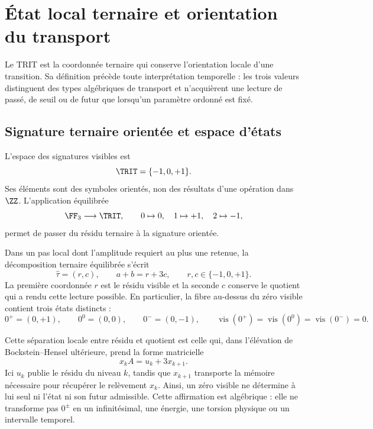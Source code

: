\ifdefined\HMTTRITFormal
\chapter{État local ternaire et orientation du transport}
\label{chap:trit}

Le TRIT est la coordonnée ternaire qui conserve l'orientation locale d'une
transition. Sa définition précède toute interprétation temporelle : les
trois valeurs distinguent des types algébriques de transport et n'acquièrent une
lecture de passé, de seuil ou de futur que lorsqu'un paramètre ordonné est fixé.

\section{Signature ternaire orientée et espace d'états}

L'espace des signatures visibles est
\[
\TRIT=\{-1,0,+1\}.
\]
Ses éléments sont des symboles orientés, non des résultats d'une opération dans
\(\ZZ\). L'application équilibrée
\[
\FF_3\longrightarrow\TRIT,
\qquad0\mapsto0,\quad1\mapsto+1,\quad2\mapsto-1,
\]
permet de passer du résidu ternaire à la signature orientée.

\begin{definition}
\label{def:trit-levantado-carry-rev8}
Dans un pas local dont l'amplitude requiert au plus une retenue, la
décomposition ternaire équilibrée s'écrit
\[
 \widehat\tau=(r,c),\qquad
 a+b=r+3c,
 \qquad r,c\in\{-1,0,+1\}.
\]
La première coordonnée \(r\) est le résidu visible et la seconde \(c\) conserve
le quotient qui a rendu cette lecture possible.  En particulier, la fibre au-dessus du
zéro visible contient trois états distincts :
\[
 0^+=(0,+1),\qquad 0^0=(0,0),\qquad 0^-=(0,-1),
 \qquad
 \operatorname{vis}(0^+)=\operatorname{vis}(0^0)
 =\operatorname{vis}(0^-)=0.
\]
\end{definition}

Cette séparation locale entre résidu et quotient est celle qui, dans l'élévation
de Bockstein--Hensel ultérieure, prend la forme matricielle
\[
 x_k A=u_k+3x_{k+1}.
\]
Ici \(u_k\) publie le résidu du niveau \(k\), tandis que \(x_{k+1}\)
transporte la mémoire nécessaire pour récupérer le relèvement \(x_k\).  Ainsi,
un zéro visible ne détermine à lui seul ni l'état ni son futur admissible.
Cette affirmation est algébrique : elle ne transforme pas \(0^\pm\) en un infinitésimal,
une énergie, une torsion physique ou un intervalle temporel.

